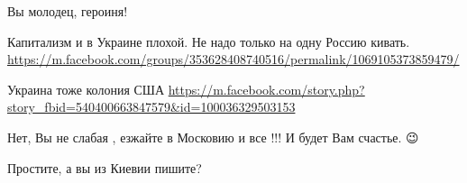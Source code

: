 \begin{itemize}
\par
 
Вы молодец, героиня!

 
Капитализм и в Украине плохой.
Не надо только на одну Россию кивать.
\url{https://m.facebook.com/groups/353628408740516/permalink/1069105373859479/}

 
Украина тоже колония США
\url{https://m.facebook.com/story.php?story_fbid=540400663847579&id=100036329503153}

 
Нет, Вы не слабая , езжайте в Московию и все !!! И будет Вам счастье. 😉

\begin{itemize}
 
Простите, а вы из Киевии пишите?

 

\end{itemize}
\end{itemize}
